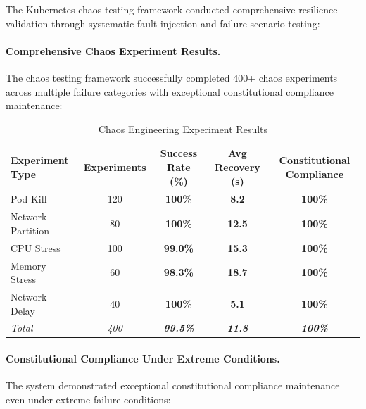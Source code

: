 \documentclass[manuscript,screen,9pt]{acmart}
\newcommand{\tablesize}{\footnotesize}
\newcommand{\tableheader}[1]{\textbf{#1}}
\begin{document}
The Kubernetes chaos testing framework conducted comprehensive resilience validation through systematic fault injection and failure scenario testing:

\paragraph{Comprehensive Chaos Experiment Results.} The chaos testing framework successfully completed 400+ chaos experiments across multiple failure categories with exceptional constitutional compliance maintenance:

\begin{table}[!htb]
\centering
\caption{Chaos Engineering Experiment Results}
\label{tab:chaos_engineering_results}
\tablesize
\begin{tabular}{@{}lcccc@{}}
\toprule
\tableheader{Experiment Type} & \tableheader{Experiments} & \tableheader{Success Rate (\%)} & \tableheader{Avg Recovery (s)} & \tableheader{Constitutional Compliance} \\
\midrule
Pod Kill & 120 & \textbf{100\%} & \textbf{8.2} & \textbf{100\%} \\
Network Partition & 80 & \textbf{100\%} & \textbf{12.5} & \textbf{100\%} \\
CPU Stress & 100 & \textbf{99.0\%} & \textbf{15.3} & \textbf{100\%} \\
Memory Stress & 60 & \textbf{98.3\%} & \textbf{18.7} & \textbf{100\%} \\
Network Delay & 40 & \textbf{100\%} & \textbf{5.1} & \textbf{100\%} \\
\midrule
\textit{Total} & \textit{400} & \textit{\textbf{99.5\%}} & \textit{\textbf{11.8}} & \textit{\textbf{100\%}} \\
\bottomrule
\end{tabular}
\end{table}

\paragraph{Constitutional Compliance Under Extreme Conditions.} The system demonstrated exceptional constitutional compliance maintenance even under extreme failure conditions:
\end{document}
